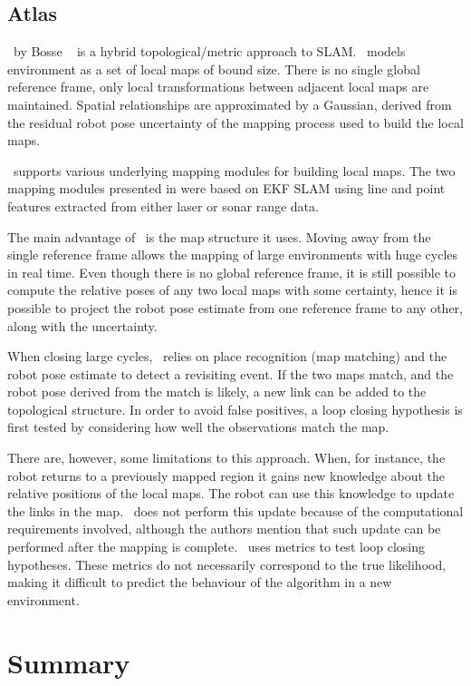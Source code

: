 \subsection{Atlas}

\Atlas\ by Bosse \etal\ \cite{bosse03atlas} is a hybrid
topological/metric approach to SLAM. \Atlas\ models environment as a
set of local maps of bound size. There is no single global reference
frame, only local transformations between adjacent local maps are
maintained. Spatial relationships are approximated by a Gaussian,
derived from the residual robot pose uncertainty of the mapping
process used to build the local maps.

\Atlas\ supports various underlying mapping modules for building local
maps. The two mapping modules presented in \cite{bosse03atlas} were
based on EKF SLAM using line and point features extracted from either
laser or sonar range data.

The main advantage of \Atlas\ is the map structure it uses. Moving
away from the single reference frame allows the mapping of large
environments with huge cycles in real time. Even though there is no
global reference frame, it is still possible to compute the relative
poses of any two local maps with some certainty, hence it is possible
to project the robot pose estimate from one reference frame to any
other, along with the uncertainty.


When closing large cycles, \Atlas\ relies on place recognition
(map matching) and the robot pose estimate to detect a revisiting
event. If the two maps match, and the robot pose derived from the
match is likely, a new link can be added to the topological structure.
In order to avoid false positives, a loop closing hypothesis is first
tested by considering how well the observations match the map.

There are, however, some limitations to this approach. When, for
instance, the robot returns to a previously mapped region it gains new
knowledge about the relative positions of the local maps. The robot
can use this knowledge to update the links in the map. \Atlas\ does
not perform this update because of the computational requirements
involved, although the authors mention that such update can be performed
after the mapping is complete. \Atlas\ uses metrics to test loop
closing hypotheses. These metrics do not necessarily correspond to the
true likelihood, making it difficult to predict the behaviour of the
algorithm in a new environment.

\section{Summary}

